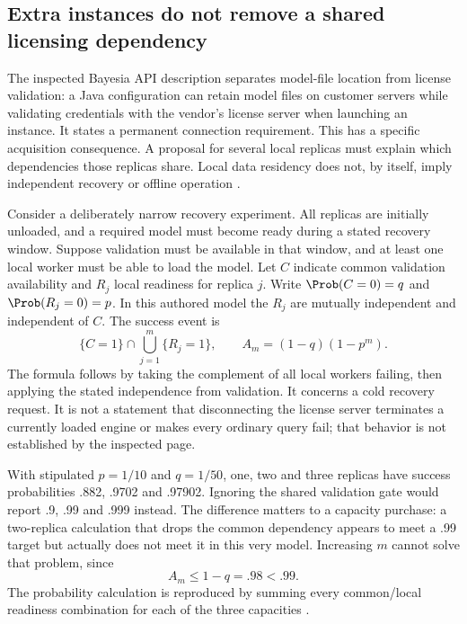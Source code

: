 \subsection{Extra instances do not remove a shared licensing dependency}
\label{exec17:s8-availability}

The inspected Bayesia API description separates model-file location from
license validation: a Java configuration can retain model files on customer
servers while validating credentials with the vendor's license server when
launching an instance. It states a permanent connection requirement. This
has a specific acquisition consequence. A proposal for several local replicas
must explain which dependencies those replicas share. Local data residency
does not, by itself, imply independent recovery or offline operation
\citep{exec13_bayesia_api}.

Consider a deliberately narrow recovery experiment. All replicas are initially
unloaded, and a required model must become ready during a stated recovery
window. Suppose validation must be available in that window, and at least one
local worker must be able to load the model. Let $C$ indicate common validation
availability and $R_j$ local readiness for replica $j$. Write
$\Prob(C=0)=q$ and $\Prob(R_j=0)=p$. In this authored model the $R_j$ are
mutually independent and independent of $C$. The success event is
\begin{equation}
 \{C=1\}\cap\bigcup_{j=1}^m\{R_j=1\},\qquad
 A_m=(1-q)(1-p^m).
 \label{exec17:s8-common-recovery}
\end{equation}
The formula follows by taking the complement of all local workers failing,
then applying the stated independence from validation. It concerns a cold
recovery request. It is not a statement that disconnecting the license server
terminates a currently loaded engine or makes every ordinary query fail;
that behavior is not established by the inspected page.

With stipulated $p=1/10$ and $q=1/50$, one, two and three replicas have success
probabilities .882, .9702 and .97902. Ignoring the shared validation gate would
report .9, .99 and .999 instead. The difference matters to a capacity purchase:
a two-replica calculation that drops the common dependency appears to meet a
.99 target but actually does not meet it in this very model. Increasing $m$
cannot solve that problem, since
\begin{equation}
 A_m\leq1-q=.98<.99.
 \label{exec17:s8-recovery-ceiling}
\end{equation}
The probability calculation is reproduced by summing every common/local
readiness combination for each of the three capacities
\citep{exec17_s8_availability}.

